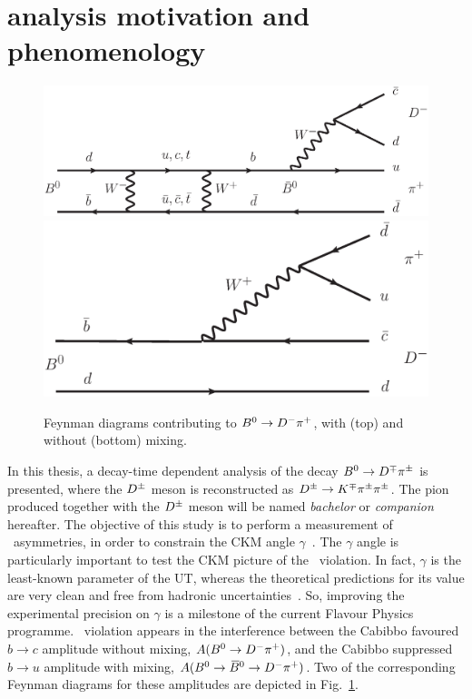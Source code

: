 
\section[$\Bz\to\Dmp\pipm$ analysis motivation and phenomenology]{\boldmath{$\Bz\to\Dpm\pimp$} analysis motivation and phenomenology}
\label{sec:intro}
\setlength{\textfloatsep}{30pt}
\begin{figure}[t]
        \begin{center}
                \includegraphics[width=0.8\linewidth]{01Introduction/figs/Mixed.eps}
                \includegraphics[width=0.7\linewidth]{01Introduction/figs/Unmixed.eps}
        \end{center}
        \vspace{-2mm}
        \caption{Feynman diagrams contributing to $B^0\rightarrow D^-\pi^+$, with (top) and without (bottom) mixing.}
        \label{fig:Feynman}
        \afterpage{\global\setlength{\textfloatsep}{\oldtextfloatsep}}
\end{figure}
In this thesis, a decay-time dependent analysis of the decay $\Bz\to
\Dmp\pipm$ is presented, where the $D^\pm$ meson is reconstructed as $D^\pm\rightarrow K^\mp\pi^\pm\pi^\pm$. The 
pion produced together with the $D^\pm$ meson will be named \emph{bachelor} or \emph{companion} hereafter.
The objective of this study is to perform a
measurement of \CP~asymmetries, in order to constrain the CKM angle
$\gamma$~\cite{PRL-10-1963-531,PTP-49-1973-652}. The $\gamma$ angle is particularly important to test 
the CKM picture of the \CP~violation. In fact, $\gamma$ is the least-known parameter of the UT, whereas 
the theoretical predictions for its value are very clean and free from hadronic uncertainties~\cite{Fleischer:2003yb,Aleksan:1991nh,Dunietz:1987bvsss}. 
So, improving the experimental precision on $\gamma$ is a milestone of the current Flavour Physics programme.
\CP~violation appears in the interference between the Cabibbo favoured $b\to c$
amplitude without mixing, $A(B^0\rightarrow D^-\pi^+)$, and the Cabibbo suppressed $b\to u$
amplitude with mixing, $A(B^0\rightarrow\kern 0.18em\overline{\kern -0.18em B}{}^0\rightarrow D^-\pi^+)$. Two of the corresponding
Feynman diagrams for these amplitudes are depicted in Fig.~\ref{fig:Feynman}.

